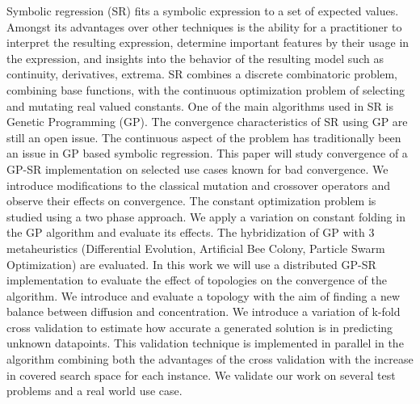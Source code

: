Symbolic regression (SR) fits a symbolic expression to a set of expected values.
Amongst its advantages over other techniques is the ability for a practitioner to interpret the resulting expression, determine important features by their usage in the expression, and insights into the behavior of the resulting model such as continuity, derivatives, extrema.
SR combines a discrete combinatoric problem, combining base functions, with the continuous optimization problem of selecting and mutating real valued constants.
One of the main algorithms used in SR is Genetic Programming (GP). The convergence characteristics of SR using GP are still an open issue.
The continuous aspect of the problem has traditionally been an issue in GP based symbolic regression. This paper will study convergence of a GP-SR implementation on selected use cases known for bad convergence.
We introduce modifications to the classical mutation and crossover operators and observe their effects on convergence. 
The constant optimization problem is studied using a two phase approach. We apply a variation on constant folding in the GP algorithm and evaluate its effects. The hybridization of GP with 3 metaheuristics (Differential Evolution, Artificial Bee Colony, Particle Swarm Optimization) are evaluated. 
In this work we will use a distributed GP-SR implementation to evaluate the effect of topologies on the convergence of the algorithm.
We introduce and evaluate a topology with the aim of finding a new balance between diffusion and concentration.
We introduce a variation of k-fold cross validation to estimate how accurate a generated solution is in predicting unknown datapoints. This validation technique is implemented in parallel in the algorithm combining both the advantages of the cross validation with the increase in covered search space for each instance.
We validate our work on several test problems and a real world use case.